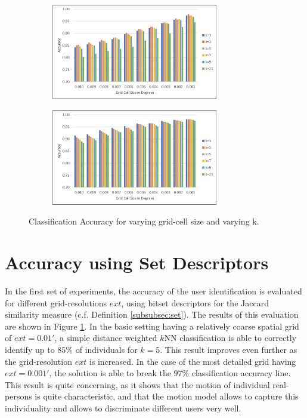\begin{figure}[ph]
	\centering
	\begin{subfigure}[b]{\textwidth}
		\centering
		\includegraphics[width = 0.8\textwidth]{figures/jaccard_compare}
    \label{fig:jaccard_compare}
	\end{subfigure}

	\begin{subfigure}[b]{\textwidth}
		\centering
		\includegraphics[width = 0.8\textwidth]{figures/cosine_compare}
  	\label{fig:cosine_compare}
	\end{subfigure}
  \caption{Classification Accuracy for varying grid-cell size and varying k.}
  \label{fig:results-ext}
	\figSpace
\end{figure}

\section{Accuracy using Set Descriptors}

In the first set of experiments, the accuracy of the user identification is evaluated for different grid-resolutions $ext$, using bitset descriptors for the Jaccard similarity measure (c.f. Definition \ref{subsubsec:set}). The results of this evaluation are shown in Figure \ref{fig:jaccard_compare}. In the basic setting having a relatively coarse spatial grid of $ext=0.01'$, a simple distance weighted $k$NN classification is able to correctly identify up to $85\%$ of individuals for $k=5$. This result improves even further as the grid-resolution $ext$ is increased. In the case of the most detailed grid having $ext=0.001'$, the solution is able to break the $97\%$ classification accuracy line.
This result is quite concerning, as it shows that the motion of individual real-persons is quite characteristic, and that the motion model allows to capture this individuality and allows to discriminate different users very well.

